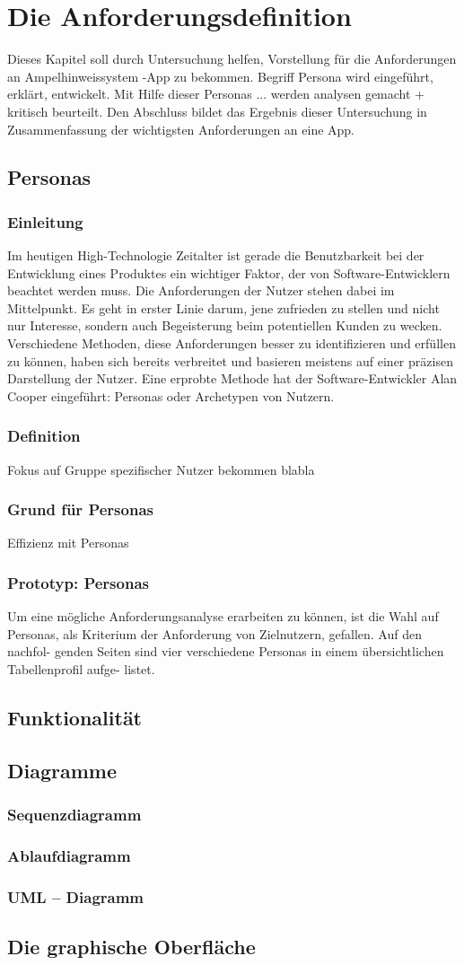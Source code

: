 \chapter{Die Anforderungsdefinition}
Dieses Kapitel soll durch Untersuchung helfen, Vorstellung für die Anforderungen an Ampelhinweissystem -App zu bekommen. Begriff Persona wird eingeführt, erklärt, entwickelt.
Mit Hilfe dieser Personas ... werden analysen gemacht + kritisch beurteilt.
Den Abschluss bildet das Ergebnis dieser Untersuchung in Zusammenfassung der wichtigsten Anforderungen an eine App.
\section{Personas}
\subsection*{Einleitung}
Im heutigen High-Technologie Zeitalter ist gerade die Benutzbarkeit bei der Entwicklung eines Produktes ein wichtiger Faktor, der von Software-Entwicklern beachtet werden muss. Die Anforderungen der Nutzer stehen dabei im Mittelpunkt. Es geht in erster Linie darum, jene zufrieden zu stellen und nicht nur Interesse, sondern auch Begeisterung beim potentiellen Kunden zu wecken. Verschiedene Methoden, diese Anforderungen besser zu identifizieren und erfüllen zu können, haben sich bereits verbreitet und basieren meistens auf einer präzisen Darstellung der Nutzer. Eine erprobte Methode hat der Software-Entwickler Alan Cooper eingeführt: Personas oder Archetypen von Nutzern.
\subsection*{Definition}
Fokus auf Gruppe spezifischer Nutzer bekommen blabla
\subsection*{Grund für Personas}
Effizienz mit Personas
\subsection*{Prototyp: Personas}
Um eine mögliche Anforderungsanalyse erarbeiten zu können, ist die
Wahl auf Personas, als Kriterium der Anforderung von Zielnutzern, gefallen. Auf den nachfol-
genden Seiten sind vier verschiedene Personas in einem übersichtlichen Tabellenprofil aufge-
listet.
\section{Funktionalität}
\section{Diagramme}
\subsection*{Sequenzdiagramm}
\subsection*{Ablaufdiagramm}
\subsection*{UML -- Diagramm}
\section{Die graphische Oberfläche}

